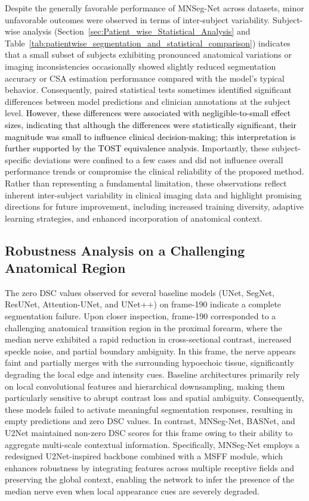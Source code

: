 Despite the generally favorable performance of MNSeg-Net across datasets, minor unfavorable outcomes were observed in terms of inter-subject variability. Subject-wise analysis (Section~\ref{sec:Patient_wise_Statistical_Analysis} and Table~\ref{tab:patientwise_segmentation_and_statistical_comparison})  indicates that a small subset of subjects exhibiting pronounced anatomical variations or imaging inconsistencies occasionally showed slightly reduced segmentation accuracy or CSA estimation performance compared with the model’s typical behavior. Consequently, paired statistical tests sometimes identified significant differences between model predictions and clinician annotations at the subject level. \textcolor{black}{However, these differences were associated with negligible-to-small effect sizes, indicating that although  the differences were statistically significant, their magnitude was small to influence clinical decision-making; this interpretation is further supported by the TOST equivalence analysis.} Importantly, these subject-specific deviations were confined to a few cases and did not influence overall performance trends or compromise the clinical reliability of the proposed method. Rather than representing a fundamental limitation, these observations reflect inherent inter-subject variability in clinical imaging data and highlight promising directions for future improvement, including increased training diversity, adaptive learning strategies, and enhanced incorporation of anatomical context.



\subsection{Robustness Analysis on a Challenging Anatomical Region}

The zero DSC values observed for several baseline models (UNet, SegNet, ResUNet, Attention-UNet, and UNet++) on frame-190 indicate a complete segmentation failure. Upon closer inspection, frame-190 corresponded to a challenging anatomical transition region in the proximal forearm, where the median nerve exhibited a rapid reduction in cross-sectional contrast, increased speckle noise, and partial boundary ambiguity. In this frame, the nerve appears faint and partially merges with the surrounding hypoechoic tissue, significantly degrading the local edge and intensity cues. Baseline architectures primarily rely on local convolutional features and hierarchical downsampling, making them particularly sensitive to abrupt contrast loss and spatial ambiguity. Consequently, these models failed to activate meaningful segmentation responses, resulting in empty predictions and zero DSC values. In contrast, MNSeg-Net, BASNet, and U2Net maintained non-zero DSC scores for this frame owing to their ability to aggregate multi-scale contextual information. Specifically, MNSeg-Net employs a redesigned U2Net-inspired backbone combined with a MSFF module, which enhances robustness by integrating features across multiple receptive fields and preserving the global context, enabling the network to infer the presence of the median nerve even when local appearance cues are severely degraded. 




